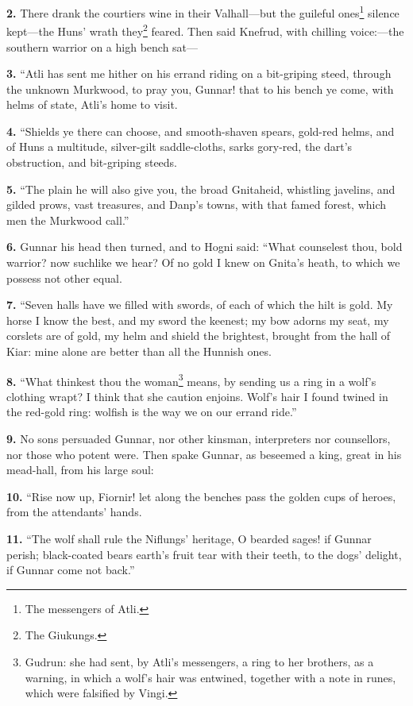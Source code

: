 \textbf{2.} There drank the courtiers wine in their Valhall—but the guileful
ones\footnote{The messengers of Atli.} silence kept—the Huns' wrath they\footnote{The Giukungs.} feared. Then said
Knefrud, with chilling voice:—the southern warrior on a high bench
sat—

\textbf{3.} ``Atli has sent me hither on his errand riding on a bit-griping
steed, through the unknown Murkwood, to pray you, Gunnar! that to his
bench ye come, with helms of state, Atli's home to visit.

\textbf{4.} ``Shields ye there can choose, and smooth-shaven spears, gold-red
helms, and of Huns a multitude, silver-gilt saddle-cloths, sarks
gory-red, the dart's obstruction, and bit-griping steeds.

\textbf{5.} ``The plain he will also give you, the broad Gnitaheid, whistling
javelins, and gilded prows, vast treasures, and Danp's towns, with
that famed forest, which men the Murkwood call.''

\textbf{6.} Gunnar his head then turned, and to Hogni said: ``What counselest
thou, bold warrior? now suchlike we hear? Of no gold I knew on Gnita's
heath, to which we possess not other equal.

\textbf{7.} ``Seven halls have we filled with swords, of each of which the
hilt is gold. My horse I know the best, and my sword the keenest; my
bow adorns my seat, my corslets are of gold, my helm and shield the
brightest, brought from the hall of Kiar: mine alone are better than
all the Hunnish ones.

\textbf{8.} ``What thinkest thou the woman\footnote{Gudrun: she had sent, by Atli's messengers, a ring to
her brothers, as a warning, in which a wolf's hair was entwined,
together with a note in runes, which were falsified by Vingi.} means, by sending us a ring in
a wolf's clothing wrapt? I think that she caution enjoins. Wolf's hair
I found twined in the red-gold ring: wolfish is the way we on our
errand ride.''

\textbf{9.} No sons persuaded Gunnar, nor other kinsman, interpreters nor
counsellors, nor those who potent were. Then spake Gunnar, as beseemed
a king, great in his mead-hall, from his large soul:

\textbf{10.} ``Rise now up, Fiornir! let along the benches pass the golden
cups of heroes, from the attendants' hands.

\textbf{11.} ``The wolf shall rule the Niflungs' heritage, O bearded sages! if
Gunnar perish; black-coated bears earth's fruit tear with their teeth,
to the dogs' delight, if Gunnar come not back.''

